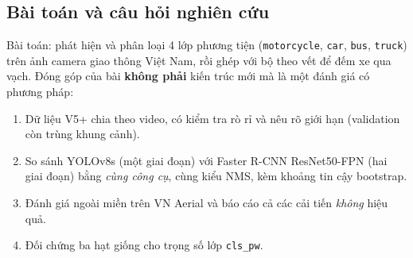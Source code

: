 \documentclass[11pt,a4paper]{article}
\begin{document}
\subsection{Bài toán và câu hỏi nghiên cứu}
Bài toán: phát hiện và phân loại 4 lớp phương tiện (\texttt{motorcycle}, \texttt{car}, \texttt{bus}, \texttt{truck}) trên ảnh camera giao thông Việt Nam, rồi ghép với bộ theo vết để đếm xe qua vạch. Đóng góp của bài \textbf{không phải} kiến trúc mới mà là một đánh giá có phương pháp:
\begin{enumerate}
\item Dữ liệu V5+ chia theo video, có kiểm tra rò rỉ và nêu rõ giới hạn (validation còn trùng khung cảnh).
\item So sánh YOLOv8s (một giai đoạn) với Faster R-CNN ResNet50-FPN (hai giai đoạn) bằng \emph{cùng công cụ}, cùng kiểu NMS, kèm khoảng tin cậy bootstrap.
\item Đánh giá ngoài miền trên VN Aerial và báo cáo cả các cải tiến \emph{không} hiệu quả.
\item Đối chứng ba hạt giống cho trọng số lớp \texttt{cls\_pw}.
\end{enumerate}
\end{document}
